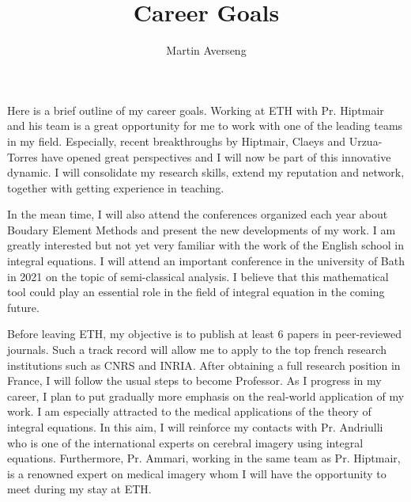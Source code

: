 \documentclass[]{article}
\title{Career Goals}
\author{Martin Averseng}
\begin{document}
\maketitle

Here is a brief outline of my career goals.
Working at ETH with Pr. Hiptmair and his team is a great opportunity for me to work with one of the leading teams in my field. Especially, recent breakthroughs by Hiptmair, Claeys and Urzua-Torres have opened great perspectives and I will now be part of this innovative dynamic. I will consolidate my research skills, extend my reputation and network, together with getting experience in teaching. 

In the mean time, I will also attend the conferences organized each year about Boudary Element Methods and present the new developments of my work. I am greatly interested but not yet very familiar with the work of the English school in integral equations. I will attend an important conference in the university of Bath in 2021 on the topic of semi-classical analysis. I believe that this mathematical tool could play an essential role in the field of integral equation in the coming future. 


Before leaving ETH, my objective is to publish at least 6 papers in peer-reviewed journals. Such a track record will allow me to apply to the top french research institutions such as CNRS and INRIA. After obtaining a full research position in France, I will follow the usual steps to become Professor. 
As I progress in my career, I plan to put gradually more emphasis on the real-world application of my work. I am especially attracted to the medical applications of the theory of integral equations. In this aim, I will reinforce my contacts with Pr. Andriulli who is one of the international experts on cerebral imagery using integral equations. Furthermore, Pr. Ammari, working in the same team as Pr. Hiptmair, is a renowned expert on medical imagery whom I will have the opportunity to meet during my stay at ETH. 
\end{document}
